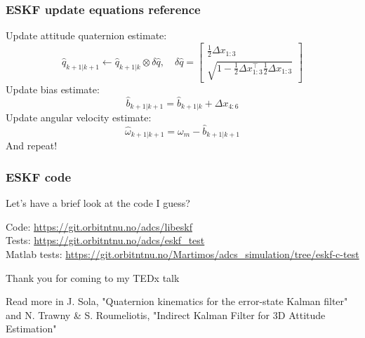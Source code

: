 \documentclass{beamer}
\begin{document}

\begin{frame}
    \frametitle{ESKF update equations reference}
    Update attitude quaternion estimate:
    \begin{equation}
        \hat{{q}}_{k+1 | k+1} \leftarrow \hat{{q}}_{k+1 | k} \otimes \delta \hat{{q}}, \quad 
    \delta \hat{{q}}=\left[\begin{array}{c}{\frac{1}{2}\Delta x_{1:3}} \\ {\sqrt{1-\frac{1}{2}\Delta x_{1:3}^{\top} \frac{1}{2}\Delta x_{1:3}}}\end{array}\right]
    \end{equation}
    Update bias estimate:
    \begin{equation}
        \hat{{b}}_{k+1 | k+1}=\hat{{b}}_{k+1 | k}+\Delta x_{4:6}
    \end{equation}
    Update angular velocity estimate:
    \begin{equation}
        \hat{\omega}_{k+1 | k+1}=\omega_{m}-\hat{{b}}_{k+1 | k+1}
    \end{equation}
    And repeat!
\end{frame}


\begin{frame}
    \frametitle{ESKF code}
    \large{\centerline{Let's have a brief look at the code I guess?}}
   \begin{center}
    \small{Code: \url{https://git.orbitntnu.no/adcs/libeskf} \\
    Tests: \url{https://git.orbitntnu.no/adcs/eskf_test} \\
    Matlab tests: \url{https://git.orbitntnu.no/Martimos/adcs_simulation/tree/eskf-c-test}}
   \end{center}
\end{frame}


\begin{frame}
\huge{\centerline{Thank you for coming to my TEDx talk}}
\begin{center}
\small{Read more in J. Sola, "Quaternion kinematics for the error-state Kalman filter" and N. Trawny \& S. Roumeliotis, "Indirect Kalman Filter for 3D Attitude Estimation"}
\end{center}
\end{frame}

\end{document}
